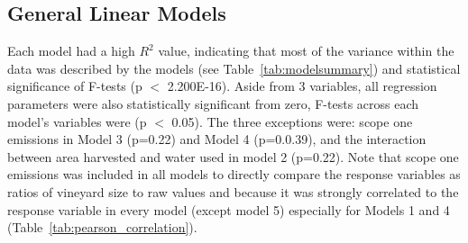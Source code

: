 \documentclass[10pt,letterpaper]{article}
\begin{document}
\subsection*{General Linear Models}

Each model had a high $R^2$ value, indicating that most of the variance within the data was described by the models (see Table~\ref{tab:modelsummary}) and statistical significance of F-tests (p $<$ 2.200E-16). Aside from 3 variables, all regression parameters were also statistically significant from zero, F-tests across each model's variables were (p $<$ 0.05). The three exceptions were: scope one emissions in Model 3 (p=0.22) and Model 4 (p=0.0.39), and the interaction between area harvested and water used in model 2 (p=0.22). Note that scope one emissions was included in all models to directly compare the response variables as ratios of vineyard size to raw values and because it was strongly correlated to the response variable in every model (except model 5) especially for Models 1 and 4 (Table~\ref{tab:pearson_correlation}). 
\par
\end{document}
